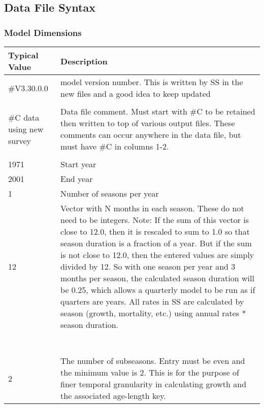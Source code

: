 \subsection{Data File Syntax}

\subsubsection{Model Dimensions}
\begin{center}
	\begin{tabular}{p{4cm} p{12cm}}
			\textbf{Typical Value} & \textbf{Description} \\
			\hline
			\#V3.30.0.0 & \multirow{1}{1cm}[-0.1cm]{\parbox{12cm}{model version number.  This is written by SS in the  new files and a good idea to keep updated}} \\
			&  \\
			\hline
			\#C data using new survey & \multirow{1}{1cm}[-0.1cm]{\parbox{12cm}{Data file comment. Must start with \#C to be retained then written to top of various output files.  These comments can occur anywhere in the data file, but must have \#C in columns 1-2.}} \\
			&  \\
			\hline
			1971 & Start year \\
			\hline
			2001 & End year \\
			\hline
			1 & Number of seasons per year \\
			\hline
			12 & \multirow{1}{1cm}[-0.1cm]{\parbox{12cm}{Vector with N months in each season.  These do not need to be integers.  Note:  If the sum of this vector is close to 12.0, then it is rescaled to sum to 1.0 so that season duration is a fraction of a year.  But if the sum is not close to 12.0, then the entered values are simply divided by 12.  So with one season per year and 3 months per season, the calculated season duration will be 0.25, which allows a quarterly model to be run as if quarters are years.  All rates in SS are  calculated by season (growth, mortality, etc.) using annual rates * season duration.}} \\
			& \\
			& \\
			& \\
			& \\
			& \\
			& \\
			& \\
			\hline
			2 & \multirow{1}{1cm}[-0.1cm]{\parbox{12cm}{The number of subseasons.  Entry must be even and the minimum value is 2. This is for the purpose of finer temporal granularity in calculating growth and the associated age-length key.}}\\

\end{tabular}
\end{center}
